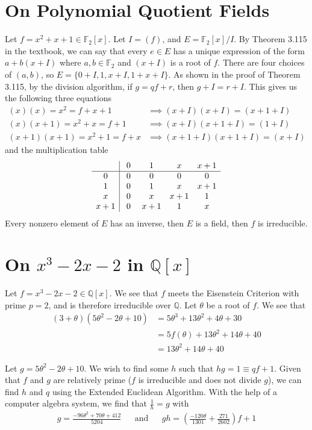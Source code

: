 \documentclass[12pt]{article}
\newcommand*{\Q}{\mathbb{Q}}
\newcommand*{\F}{\mathbb{F}}
\begin{document}
\section{On Polynomial Quotient Fields}
Let $f = x^2  + x + 1 \in \F_2[x]$. Let $I = (f)$, and $E = \F_2[x] / I$. By Theorem 3.115 in the textbook, we can say that every $e \in E$ has a unique expression of the form $a + b(x + I)$ where $a,b \in \F_2$ and $(x + I)$ is a root of $f$. There are four choices of $(a, b)$, so $E = \{0 + I, 1, x + I, 1 + x + I\}$. As shown in the proof of Theorem 3.115, by the division algorithm, if $g = qf + r$, then $g + I = r + I$. This gives us the following three equations
\begin{align*}
(x)(x) = x^2 = f + x + 1 &\implies (x + I)(x + I) = (x + 1 + I)\\
(x)(x + 1) = x^2 + x = f + 1 &\implies (x + I)(x + 1 + I) = (1 + I)\\
(x + 1)(x + 1) = x^2 + 1 = f + x &\implies (x + 1 + I)(x + 1 + I) = (x + I)
\end{align*}
\noindent and the multiplication table
\[
\begin{array}{c | c c c c}
      & \,\,0\,\, & \,\,1\,\, & \,\,x\,\, & x + 1\\\hline
0     & 0 & 0     & 0     & 0\\
1     & 0 & 1     & x     & x + 1\\
x     & 0 & x     & x + 1 & 1\\
x + 1 & 0 & x + 1 & 1     & x
\end{array}
\]
Every nonzero element of $E$ has an inverse, then $E$ is a field, then $f$ is irreducible.

\section{On $x^3 - 2x - 2$ in $\Q[x]$}
Let $f = x^3 - 2x - 2 \in \Q[x]$. We see that $f$ meets the Eisenstein Criterion with prime $p = 2$, and is therefore irreducible over $\Q$. Let $\theta$ be a root of $f$. We see that 
\begin{align*}
(3 + \theta)(5 \theta^2 -2\theta + 10) &= 5\theta^3 + 13 \theta^2 + 4\theta + 30\\
&= 5f(\theta) + 13\theta^2 + 14\theta + 40\\
&= 13\theta^2 + 14\theta + 40
\end{align*}

Let $g = 5\theta^2 - 2\theta + 10$. We wish to find some $h$ such that $hg = 1 \equiv qf + 1$. Given that $f$ and $g$ are relatively prime ($f$ is irreducible and does not divide $g$), we can find $h$ and $q$ using the Extended Euclidean Algorithm. With the help of a computer algebra system, we find that $\frac{1}{h} = g$ with
\begin{align*}
g = \frac{-96 \theta^2 + 70\theta + 412}{5204} 
&& \text{and} && 
gh = \left(\frac{-120\theta}{1301} + \frac{271}{2602}\right)f + 1
\end{align*}
\end{document}
